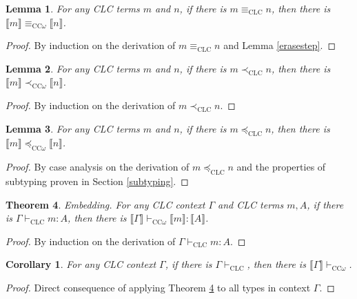 \documentclass{article}
\newtheorem{theorem}{Theorem}[section]
\newtheorem{corollary}{Corollary}[theorem]
\newtheorem{lemma}[theorem]{Lemma}
\theoremstyle{definition}
\newcommand{\erase}[1]{\llbracket #1 \rrbracket}
\begin{document}
\begin{lemma}
  For any CLC terms $m$ and $n$, if there is $m \equiv_{\scriptscriptstyle \text{CLC}} n$, then there is $\erase{m} \equiv_{\scriptscriptstyle \text{CC$\omega$}} \erase{n}$.
\end{lemma}
\begin{proof}
  By induction on the derivation of $m \equiv_{\scriptscriptstyle \text{CLC}} n$ and Lemma \ref{erasestep}.
\end{proof}

\begin{lemma}\label{erasesub1}
  For any CLC terms $m$ and $n$, if there is $m \prec_{\scriptscriptstyle \text{CLC}} n$, then there is $\erase{m} \prec_{\scriptscriptstyle \text{CC$\omega$}} \erase{n}$.
\end{lemma}
\begin{proof}
  By induction on the derivation of $m \prec_{\scriptscriptstyle \text{CLC}} n$.
\end{proof}

\begin{lemma}
  For any CLC terms $m$ and $n$, if there is $m \preceq_{\scriptscriptstyle \text{CLC}} n$, then there is $\erase{m} \preceq_{\scriptscriptstyle \text{CC$\omega$}} \erase{n}$.
\end{lemma}
\begin{proof}
  By case analysis on the derivation of $m \preceq_{\scriptscriptstyle \text{CLC}} n$ and the properties of subtyping proven in Section \ref{subtyping}.
\end{proof}

\begin{theorem}\label{embedding}
  Embedding. For any CLC context $\Gamma$ and CLC terms $m, A$, if there is $\Gamma \vdash_{\scriptscriptstyle \text{CLC}} m : A$, then there is $\erase{\Gamma} \vdash_{\scriptscriptstyle \text{CC$\omega$}} \erase{m} : \erase{A}$.
\end{theorem}
\begin{proof}
  By induction on the derivation of $\Gamma \vdash_{\scriptscriptstyle \text{CLC}} m : A$.
\end{proof}

\begin{corollary}\label{embeddingcontext}
  For any CLC context $\Gamma$, if there is $\Gamma \vdash_{\scriptscriptstyle \text{CLC}}$, then there is $\erase{\Gamma} \vdash_{\scriptscriptstyle \text{CC$\omega$}}$.
\end{corollary}
\begin{proof}
  Direct consequence of applying Theorem \ref{embedding} to all types in context $\Gamma$.
\end{proof}
\end{document}
